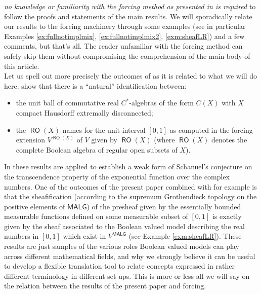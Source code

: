 \documentclass[11pt]{amsart}
\theoremstyle{plain}
\theoremstyle{definition}
\theoremstyle{plain}
\theoremstyle{remark}
\DeclareMathOperator{\RO}{\mathsf{RO}}
\newcommand{\bool}[1]{\mathsf{#1}}
\newcommand{\0}{\mathsf{0}}
\renewcommand{\1}{\mathsf{1}}
\renewcommand{\2}{\mathsf{2}}
\theoremstyle{definition}
\begin{document}
\emph{no knowledge or familiarity with the forcing method as presented in \cite{BELL,JECH,KUNEN} is required} to follow the proofs and statements of the main results. 
We will sporadically relate our results to the forcing machinery through some examples (see in particular Examples
\ref{ex:fullnotimplmix}, \ref{ex:fullnotimplmix2}, \ref{exm:sheafLR}) and a few comments, 
but that's all. The reader unfamiliar with the forcing method can safely skip them without compromising the comprehension of the main body of this article. \\
Let us spell out more precisely the outcomes of \cite{MR779056,MR759416,VIAVAC15,VIASCHANUEL} as it is related to what we will do here.
\cite{MR779056,MR759416,VIAVAC15} show 
that there is a ``natural'' identification between:
\begin{itemize}
\item the unit ball of commutative real $C^*$-algebras of the form $C(X)$ with 
$X$ compact Hausdorff extremally disconnected;
\item 
the $\RO(X)$-names for the unit interval
$[0,1]$ as computed in the forcing extension $V^{\RO(X)}$ of $V$ given by $\RO(X)$ (where $\RO(X)$ denotes the complete Boolean algebra of regular open subsets of $X$). 
\end{itemize}
In 
\cite{VIASCHANUEL} these results are applied to establish a weak form of Schanuel's conjecture on the transcendence 
property of the exponential function over the complex numbers.
One of the outcomes of the present paper combined with \cite{VIAVAC15}
for example is that the sheafification (according to the supremum Grothendieck topology on the positive elements of $\bool{MALG}$) of the presheaf given by the essentially bounded measurable functions defined on some
measurable subset of $[0,1]$ is exactly given by the sheaf associated to the Boolean valued model describing the real 
numbers in $[0,1]$ which exist in $V^{\bool{MALG}}$ (see Example \ref{exm:sheafLR}).
These results are just samples of the various roles Boolean valued models can play across different mathematical fields, 
and why we strongly believe it can be useful to develop a flexible translation tool to relate concepts expressed in rather 
different terminology in different set-ups. This is more or less all we will say on the relation between the results of the present paper and forcing.
\end{document}

